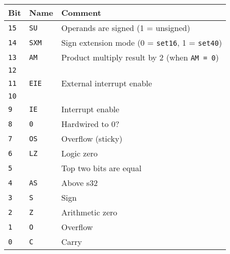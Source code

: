 \documentclass[oneside,english,a4paper,10pt,oneside,openany,final]{memoir}
\begin{document}
\begin{table}[htb]
\centering
\begin{tabular}{|l|l|l|}
\hline
\textbf{Bit} & \textbf{Name} & \textbf{Comment}                                              \\ \hline
\texttt{15}  & \texttt{SU}   & Operands are signed (1 = unsigned)                            \\ \hline
\texttt{14}  & \texttt{SXM}  & Sign extension mode (0 = \texttt{set16}, 1 = \texttt{set40})  \\ \hline
\texttt{13}  & \texttt{AM}   & Product multiply result by 2 (when \texttt{AM = 0})           \\ \hline
\texttt{12}  &               &                                                               \\ \hline
\texttt{11}  & \texttt{EIE}  & External interrupt enable                                     \\ \hline
\texttt{10}  &               &                                                               \\ \hline
\texttt{9}   & \texttt{IE}   & Interrupt enable                                              \\ \hline
\texttt{8}   & \texttt{0}    & Hardwired to 0?                                               \\ \hline
\texttt{7}   & \texttt{OS}   & Overflow (sticky)                                             \\ \hline
\texttt{6}   & \texttt{LZ}   & Logic zero                                                    \\ \hline
\texttt{5}   &               & Top two bits are equal                                        \\ \hline
\texttt{4}   & \texttt{AS}   & Above s32                                                     \\ \hline
\texttt{3}   & \texttt{S}    & Sign                                                          \\ \hline
\texttt{2}   & \texttt{Z}    & Arithmetic zero                                               \\ \hline
\texttt{1}   & \texttt{O}    & Overflow                                                      \\ \hline
\texttt{0}   & \texttt{C}    & Carry                                                         \\ \hline
\end{tabular}
\end{table}
\end{document}
